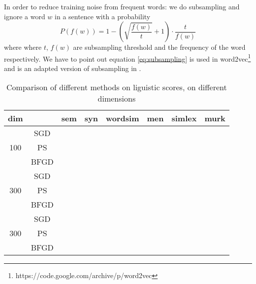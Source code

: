 \documentclass[letterpaper]{article} %
\begin{document}
In order to reduce training noise from frequent words: we do subsampling and ignore a word $w$ in a sentence with a probability
\begin{equation}
P(f(w))= 1-(\sqrt{\frac{f(w)}{t}}+1)\cdot\frac{t}{f(w)}\label{eq:subsampling}
\end{equation}
where where $t$, $f(w)$ are subsampling threshold and the frequency of the word respectively. We have to point out equation \ref{eq:subsampling} is used in word2vec\footnote{https://code.google.com/archive/p/word2vec} and is an adapted version of subsampling in \cite{NIPS2013_5021}.
\begin{table}[]
\begin{tabular}{|c|c|c|c|c|c|c|c|}
\hline
   dim      &      & sem & syn & wordsim & men & simlex & murk \\ \hline

\multirow{3}{*}{100} & SGD   &     &     &         &     &        &      \\ \cline{2-8} 
					 & PS   &     &     &         &     &        &      \\ \cline{2-8} 
                     & BFGD &     &     &         &     &        &      \\ \hline
\multirow{3}{*}{300} & SGD   &     &     &         &     &        &      \\ \cline{2-8} 
					 & PS   &     &     &         &     &        &      \\ \cline{2-8} 
                     & BFGD &     &     &         &     &        &      \\ \hline
\multirow{3}{*}{300} & SGD   &     &     &         &     &        &      \\ \cline{2-8} 
					 & PS   &     &     &         &     &        &      \\ \cline{2-8} 
                     & BFGD &     &     &         &     &        &      \\
\hline
\end{tabular}
\caption{Comparison of different methods on liguistic scores, on different dimensions}
\end{table}
\end{document}

